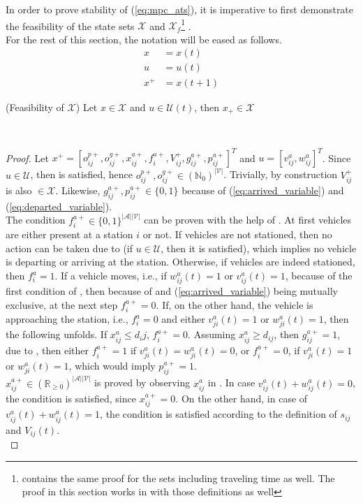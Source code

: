 In order to prove stability of (\ref{eq:mpc_ats}), it is imperative to first demonstrate the feasibility of the state sets $\mathcal{X}$ and $\mathcal{X}_f$\footnote{ contains the same proof for the sets including traveling time as well. The proof in this section works in with those definitions as well} .\\
For the rest of this section, the notation will be eased as follows. 
\begin{align*}
	x &= x(t)\\
	u &= u(t)\\
	x^+ &= x(t+1)
\end{align*} 

\begin{proposition}{(Feasibility of $\mathcal{X}$)}\label{pro:feas_x}
	Let $x \in \mathcal{X}$ and $u \in \mathcal{U}(t)$, then $x_+ \in \mathcal{X}$
\end{proposition}\\
\begin{proof}
 Let $x^+ = [o_{ij}^{p+}, o_{ij}^{g+}, x_{ij}^{a+}, f^{a+}_{i}, V_{ij}^{+}, g^{a+}_{ij}, p^{a+}_{ij}]^T$ and $u = [v^{a}_{ij}, w^{a}_{ij}]^T$. Since $u \in \mathcal{U}$, then  is satisfied, hence $o_{ij}^{p+}, o_{ij}^{g+} \in (\mathbb{N}_0)^{|\mathcal{V}|}$. Trivially, by construction $V_{ij}^{+}$ is also $\in \mathcal{X}$. Likewise, $g^{a+}_{ij}, p^{a+}_{ij} \in \{0,1\}$ because of (\ref{eq:arrived_variable}) and (\ref{eq:departed_variable}). \\
The condition $f^{a+}_{i} \in \{0,1\}^{|\mathcal{A}||\mathcal{V}|}$ can be proven with the help of . At first vehicles are either present at a station $i$ or not. If vehicles are not stationed, then no action can be taken due to  (if $u \in \mathcal{U}$, then it is satisfied), which implies no vehicle is departing or arriving at the station. Otherwise, if vehicles are indeed stationed, then $f^{a}_{i} = 1$. If a vehicle moves, i.e., if $w^a_{ij}(t) = 1$ or $v^a_{ij}(t) = 1$, because of the first condition of , then because of  and (\ref{eq:arrived_variable}) being mutually exclusive, at the next step $f^{a+}_{i} =0$. If, on the other hand, the vehicle is approaching the station, i.e., $f^{a}_{i} =0$ and 
either $v^a_{ji}(t) = 1$ or $w^a_{ji}(t) = 1$, then the following unfolds. If $x_{ij}^{a} \leq d_ij$, $f^{a+}_{i} =0$. Assuming $x_{ij}^{a} \ge d_{ij}$, then $g^{a+}_{ij} = 1$, due to , then either $f^{a+}_{i} =1$ if $v^a_{ji}(t) = w^a_{ji}(t) = 0$, or $f^{a+}_{i} =0$, if $v^a_{ji}(t) = 1$ or $w^a_{ji}(t) = 1$, which would imply $p^{a+}_{ij}=1$. \\
 $x_{ij}^{a+}\in (\mathbb{R}_{\ge 0})^{|\mathcal{A}||\mathcal{V}|}$ is proved by observing $x_{ij}^a$ in  . In case $v^a_{ij}(t) + w^a_{ij}(t)= 0$, the condition is satisfied, since  $x_{ij}^{a+} = 0$.  On the other hand, in case of $v^a_{ij}(t) + w^a_{ij}(t)= 1$, the condition is satisfied according to the definition of $s_{ij}$ and $V_{ij}(t)$.\\
 \end{proof}

